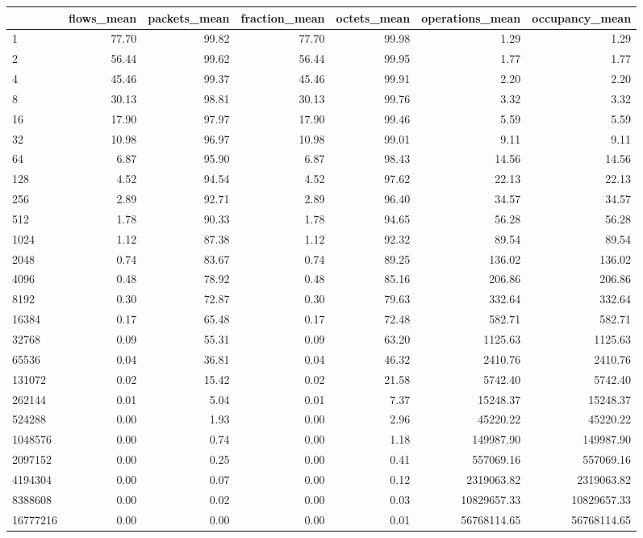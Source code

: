 \begin{tabular}{lrrrrrr}
\toprule
 & flows_mean & packets_mean & fraction_mean & octets_mean & operations_mean & occupancy_mean \\
\midrule
1 & 77.70 & 99.82 & 77.70 & 99.98 & 1.29 & 1.29 \\
2 & 56.44 & 99.62 & 56.44 & 99.95 & 1.77 & 1.77 \\
4 & 45.46 & 99.37 & 45.46 & 99.91 & 2.20 & 2.20 \\
8 & 30.13 & 98.81 & 30.13 & 99.76 & 3.32 & 3.32 \\
16 & 17.90 & 97.97 & 17.90 & 99.46 & 5.59 & 5.59 \\
32 & 10.98 & 96.97 & 10.98 & 99.01 & 9.11 & 9.11 \\
64 & 6.87 & 95.90 & 6.87 & 98.43 & 14.56 & 14.56 \\
128 & 4.52 & 94.54 & 4.52 & 97.62 & 22.13 & 22.13 \\
256 & 2.89 & 92.71 & 2.89 & 96.40 & 34.57 & 34.57 \\
512 & 1.78 & 90.33 & 1.78 & 94.65 & 56.28 & 56.28 \\
1024 & 1.12 & 87.38 & 1.12 & 92.32 & 89.54 & 89.54 \\
2048 & 0.74 & 83.67 & 0.74 & 89.25 & 136.02 & 136.02 \\
4096 & 0.48 & 78.92 & 0.48 & 85.16 & 206.86 & 206.86 \\
8192 & 0.30 & 72.87 & 0.30 & 79.63 & 332.64 & 332.64 \\
16384 & 0.17 & 65.48 & 0.17 & 72.48 & 582.71 & 582.71 \\
32768 & 0.09 & 55.31 & 0.09 & 63.20 & 1125.63 & 1125.63 \\
65536 & 0.04 & 36.81 & 0.04 & 46.32 & 2410.76 & 2410.76 \\
131072 & 0.02 & 15.42 & 0.02 & 21.58 & 5742.40 & 5742.40 \\
262144 & 0.01 & 5.04 & 0.01 & 7.37 & 15248.37 & 15248.37 \\
524288 & 0.00 & 1.93 & 0.00 & 2.96 & 45220.22 & 45220.22 \\
1048576 & 0.00 & 0.74 & 0.00 & 1.18 & 149987.90 & 149987.90 \\
2097152 & 0.00 & 0.25 & 0.00 & 0.41 & 557069.16 & 557069.16 \\
4194304 & 0.00 & 0.07 & 0.00 & 0.12 & 2319063.82 & 2319063.82 \\
8388608 & 0.00 & 0.02 & 0.00 & 0.03 & 10829657.33 & 10829657.33 \\
16777216 & 0.00 & 0.00 & 0.00 & 0.01 & 56768114.65 & 56768114.65 \\
\bottomrule
\end{tabular}
